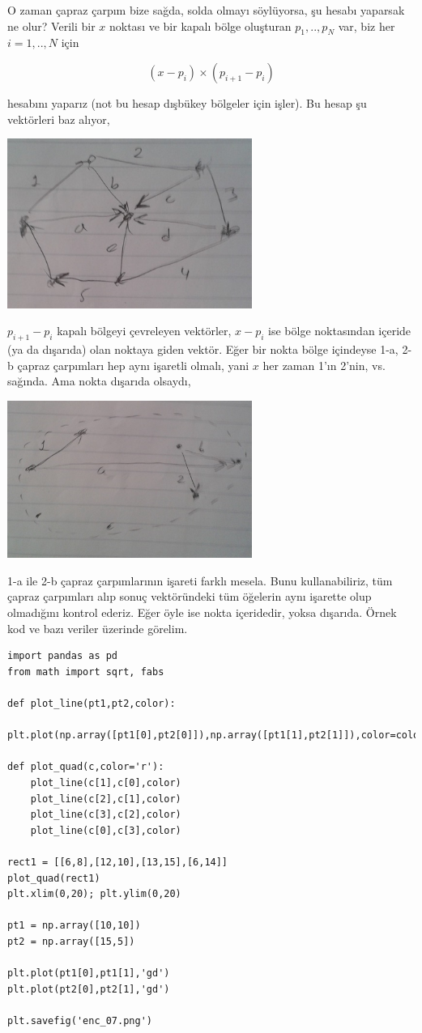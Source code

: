 \documentclass[12pt,fleqn]{article}\usepackage{../../common}
\begin{document}
O zaman çapraz çarpım bize sağda, solda olmayı söylüyorsa, şu hesabı yaparsak ne
olur? Verili bir $x$ noktası ve bir kapalı bölge oluşturan $p_1,..,p_N$ var, biz
her $i = 1,..,N$ için 

$$ (x-p_i) \times (p_{i+1}-p_i) $$

hesabını yaparız (not bu hesap dışbükey bölgeler için işler). Bu hesap şu
vektörleri baz alıyor,

\includegraphics[width=8cm]{enc_04.png}

$p_{i+1}-p_i$  kapalı bölgeyi çevreleyen vektörler, $x-p_i$ ise bölge
noktasından içeride (ya da dışarıda) olan noktaya giden vektör. Eğer bir nokta
bölge içindeyse 1-a, 2-b çapraz çarpımları hep aynı işaretli olmalı, yani $x$
her zaman 1'ın 2'nin, vs. sağında. Ama nokta dışarıda olsaydı,

\includegraphics[width=8cm]{enc_06.png}

1-a ile 2-b çapraz çarpımlarının işareti farklı mesela. Bunu kullanabiliriz, tüm
çapraz çarpımları alıp sonuç vektöründeki tüm öğelerin aynı işarette olup
olmadığını kontrol ederiz. Eğer öyle ise nokta içeridedir, yoksa dışarıda. Örnek
kod ve bazı veriler üzerinde görelim. 

\begin{verbatim}
import pandas as pd
from math import sqrt, fabs

def plot_line(pt1,pt2,color):
    plt.plot(np.array([pt1[0],pt2[0]]),np.array([pt1[1],pt2[1]]),color=color)
    
def plot_quad(c,color='r'):
    plot_line(c[1],c[0],color)
    plot_line(c[2],c[1],color)
    plot_line(c[3],c[2],color)
    plot_line(c[0],c[3],color)

rect1 = [[6,8],[12,10],[13,15],[6,14]]
plot_quad(rect1)
plt.xlim(0,20); plt.ylim(0,20)

pt1 = np.array([10,10])
pt2 = np.array([15,5])

plt.plot(pt1[0],pt1[1],'gd')
plt.plot(pt2[0],pt2[1],'gd')

plt.savefig('enc_07.png')
\end{verbatim}
\end{document}
